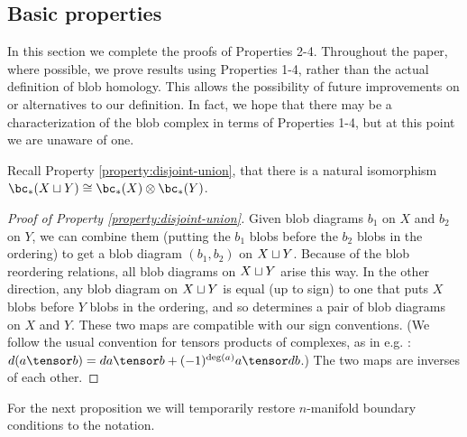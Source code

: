 
\subsection{Basic properties}
\label{sec:basic-properties}

In this section we complete the proofs of Properties 2-4. 
Throughout the paper, where possible, we prove results using Properties 1-4, 
rather than the actual definition of blob homology.
This allows the possibility of future improvements on or alternatives to our definition.
In fact, we hope that there may be a characterization of the blob complex in 
terms of Properties 1-4, but at this point we are unaware of one.

Recall Property \ref{property:disjoint-union}, 
that there is a natural isomorphism $\bc_*(X \du Y) \cong \bc_*(X) \otimes \bc_*(Y)$.

\begin{proof}[Proof of Property \ref{property:disjoint-union}]
Given blob diagrams $b_1$ on $X$ and $b_2$ on $Y$, we can combine them
(putting the $b_1$ blobs before the $b_2$ blobs in the ordering) to get a
blob diagram $(b_1, b_2)$ on $X \sqcup Y$.
Because of the blob reordering relations, all blob diagrams on $X \sqcup Y$ arise this way.
In the other direction, any blob diagram on $X\sqcup Y$ is equal (up to sign)
to one that puts $X$ blobs before $Y$ blobs in the ordering, and so determines
a pair of blob diagrams on $X$ and $Y$.
These two maps are compatible with our sign conventions.
(We follow the usual convention for tensors products of complexes, 
as in e.g. \cite{MR1438306}: $d(a \tensor b) = da \tensor b + (-1)^{\deg(a)} a \tensor db$.)
The two maps are inverses of each other.
\end{proof}

For the next proposition we will temporarily restore $n$-manifold boundary
conditions to the notation.

